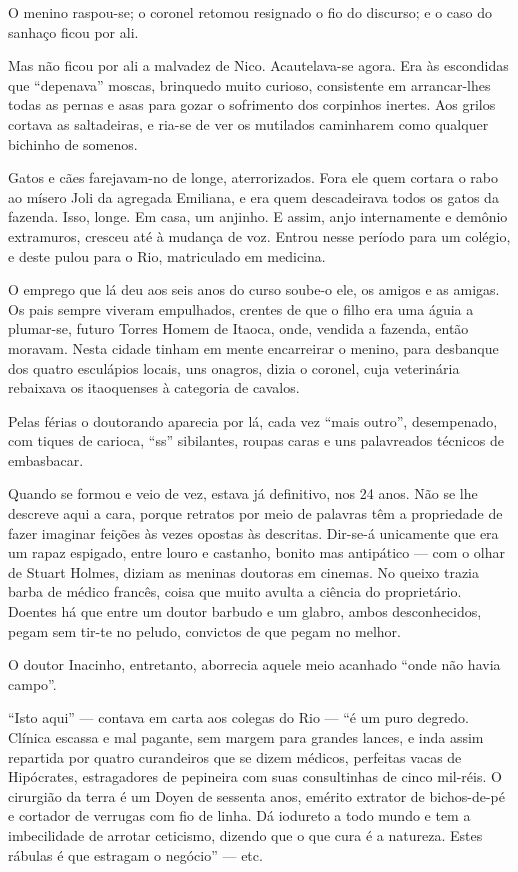 O menino raspou-se; o coronel retomou resignado o fio do discurso; e o
caso do sanhaço ficou por ali.

Mas não ficou por ali a malvadez de Nico. Acautelava-se agora. Era às
escondidas que ``depenava'' moscas, brinquedo muito curioso, consistente
em arrancar-lhes todas as pernas e asas para gozar o sofrimento dos
corpinhos inertes. Aos grilos cortava as saltadeiras, e ria-se de ver os
mutilados caminharem como qualquer bichinho de somenos.

Gatos e cães farejavam-no de longe, aterrorizados. Fora ele quem cortara
o rabo ao mísero Joli da agregada Emiliana, e era quem descadeirava
todos os gatos da fazenda. Isso, longe. Em casa, um anjinho. E assim,
anjo internamente e demônio extramuros, cresceu até à mudança de voz.
Entrou nesse período para um colégio, e deste pulou para o Rio,
matriculado em medicina.

O emprego que lá deu aos seis anos do curso soube-o ele, os amigos e as
amigas. Os pais sempre viveram empulhados, crentes de que o filho era
uma águia a plumar-se, futuro Torres Homem de Itaoca, onde, vendida a
fazenda, então moravam. Nesta cidade tinham em mente encarreirar o
menino, para desbanque dos quatro esculápios locais, uns onagros, dizia
o coronel, cuja veterinária rebaixava os itaoquenses à categoria de
cavalos.

Pelas férias o doutorando aparecia por lá, cada vez ``mais outro'',
desempenado, com tiques de carioca, ``ss'' sibilantes, roupas caras e
uns palavreados técnicos de embasbacar.

Quando se formou e veio de vez, estava já definitivo, nos 24 anos. Não
se lhe descreve aqui a cara, porque retratos por meio de palavras têm a
propriedade de fazer imaginar feições às vezes opostas às descritas.
Dir-se-á unicamente que era um rapaz espigado, entre louro e castanho,
bonito mas antipático --- com o olhar de Stuart Holmes, diziam as
meninas doutoras em cinemas. No queixo trazia barba de médico francês,
coisa que muito avulta a ciência do proprietário. Doentes há que entre
um doutor barbudo e um glabro, ambos desconhecidos, pegam sem tir-te no
peludo, convictos de que pegam no melhor.

O doutor Inacinho, entretanto, aborrecia aquele meio acanhado ``onde não
havia campo''.

``Isto aqui'' --- contava em carta aos colegas do Rio --- ``é um puro
degredo. Clínica escassa e mal pagante, sem margem para grandes lances,
e inda assim repartida por quatro curandeiros que se dizem médicos,
perfeitas vacas de Hipócrates, estragadores de pepineira com suas
consultinhas de cinco mil-réis. O cirurgião da terra é um Doyen de
sessenta anos, emérito extrator de bichos-de-pé e cortador de verrugas
com fio de linha. Dá iodureto a todo mundo e tem a imbecilidade de
arrotar ceticismo, dizendo que o que cura é a natureza. Estes rábulas é
que estragam o negócio'' --- etc.

